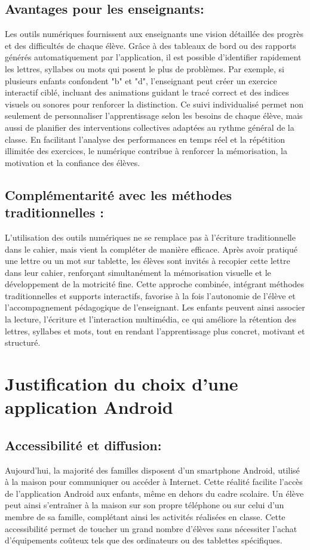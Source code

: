 \documentclass[a4paper,oneside,12pt]{book}
\begin{document}
\subsection{ Avantages pour les enseignants:}
Les outils numériques fournissent aux enseignants une vision détaillée des progrès et des difficultés de chaque élève. Grâce à des tableaux de bord ou des rapports générés automatiquement par l'application, il est possible d'identifier rapidement les lettres, syllabes ou mots qui posent le plus de problèmes. Par exemple, si plusieurs enfants confondent "b" et "d", l'enseignant peut créer un exercice interactif ciblé, incluant des animations guidant le tracé correct et des indices visuels ou sonores pour renforcer la distinction. Ce suivi individualisé permet non seulement de personnaliser l'apprentissage selon les besoins de chaque élève, mais aussi de planifier des interventions collectives adaptées au rythme général de la classe. En facilitant l'analyse des performances en temps réel et la répétition illimitée des exercices, le numérique contribue à renforcer la mémorisation, la motivation et la confiance des élèves.

\subsection{Complémentarité avec les méthodes traditionnelles :}
L'utilisation des outils numériques ne se remplace pas à l'écriture traditionnelle dans le cahier, mais vient la compléter de manière efficace. Après avoir pratiqué une lettre ou un mot sur tablette, les élèves sont invités à recopier cette lettre dans leur cahier, renforçant simultanément la mémorisation visuelle et le développement de la motricité fine. Cette approche combinée, intégrant méthodes traditionnelles et supports interactifs, favorise à la fois l'autonomie de l'élève et l'accompagnement pédagogique de l'enseignant. Les enfants peuvent ainsi associer la lecture, l'écriture et l'interaction multimédia, ce qui améliore la rétention des lettres, syllabes et mots, tout en rendant l'apprentissage plus concret, motivant et structuré.

\section{ Justification du choix d’une application Android}
\subsection{Accessibilité et diffusion:}
Aujourd'hui, la majorité des familles disposent d'un smartphone Android, utilisé à la maison pour communiquer ou accéder à Internet. Cette réalité facilite l'accès de l'application Android aux enfants, même en dehors du cadre scolaire. Un élève peut ainsi s'entraîner à la maison sur son propre téléphone ou sur celui d'un membre de sa famille, complétant ainsi les activités réalisées en classe. Cette accessibilité permet de toucher un grand nombre d'élèves sans nécessiter l'achat d'équipements coûteux tels que des ordinateurs ou des tablettes spécifiques.
\end{document}
